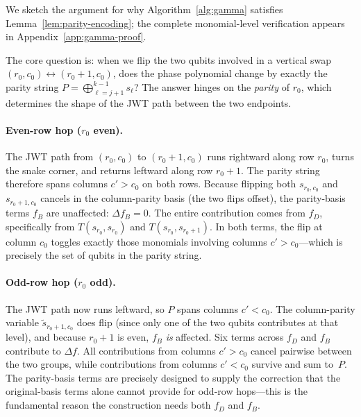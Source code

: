 We sketch the argument for why Algorithm~\ref{alg:gamma} satisfies Lemma~\ref{lem:parity-encoding}; the complete monomial-level verification appears in Appendix~\ref{app:gamma-proof}.

The core question is: when we flip the two qubits involved in a vertical swap $(r_0, c_0) \leftrightarrow (r_0{+}1, c_0)$, does the phase polynomial change by exactly the parity string $P = \bigoplus_{\ell=j+1}^{k-1} s_\ell$?
The answer hinges on the \emph{parity} of $r_0$, which determines the shape of the JWT path between the two endpoints.

\paragraph{Even-row hop ($r_0$ even).}
The JWT path from $(r_0, c_0)$ to $(r_0{+}1, c_0)$ runs rightward along row $r_0$, turns the snake corner, and returns leftward along row $r_0{+}1$.
The parity string therefore spans columns $c' > c_0$ on both rows.
Because flipping both $s_{r_0, c_0}$ and $s_{r_0{+}1, c_0}$ cancels in the column-parity basis (the two flips offset), the parity-basis terms $f_B$ are unaffected: $\Delta f_B = 0$.
The entire contribution comes from $f_D$, specifically from $T(s_{r_0}, s_{r_0})$ and $T(s_{r_0}, s_{r_0{+}1})$.
In both terms, the flip at column $c_0$ toggles exactly those monomials involving columns $c' > c_0$---which is precisely the set of qubits in the parity string.

\paragraph{Odd-row hop ($r_0$ odd).}
The JWT path now runs leftward, so $P$ spans columns $c' < c_0$.
The column-parity variable $\tilde{s}_{r_0{+}1, c_0}$ does flip (since only one of the two qubits contributes at that level), and because $r_0{+}1$ is even, $f_B$ \emph{is} affected.
Six terms across $f_D$ and $f_B$ contribute to $\Delta f$.
All contributions from columns $c' > c_0$ cancel pairwise between the two groups, while contributions from columns $c' < c_0$ survive and sum to~$P$.
The parity-basis terms are precisely designed to supply the correction that the original-basis terms alone cannot provide for odd-row hops---this is the fundamental reason the construction needs both $f_D$ and $f_B$.